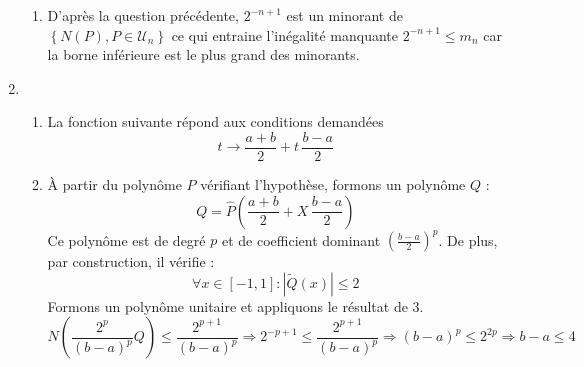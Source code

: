 \begin{enumerate}
\begin{enumerate}
\item D'après la question précédente, $2^{-n+1}$ est un minorant de $\left\lbrace N(P), P\in \mathcal U_n \right\rbrace$ ce qui entraine l'inégalité manquante $2^{-n+1}\leq m_n$ car la borne inférieure est le plus grand des minorants.
\end{enumerate}
\item \begin{enumerate}
 \item La fonction suivante répond aux conditions demandées
\begin{displaymath}
 t \rightarrow \frac{a+b}{2} + t\,\frac{b-a}{2}
\end{displaymath}
\item \`A partir du polynôme $P$ vérifiant l'hypothèse, formons un polynôme $Q$ :
\begin{displaymath}
 Q = \widehat{P}(\frac{a+b}{2} + X\,\frac{b-a}{2})
\end{displaymath}
Ce polynôme est de degré $p$ et de coefficient dominant $(\frac{b-a}{2})^p$. De plus, par construction, il vérifie :
\begin{displaymath}
 \forall x\in[-1,1] : \left\vert\widetilde{Q}(x)\right\vert\leq 2
\end{displaymath}
Formons un polynôme unitaire et appliquons le résultat de 3.
\begin{displaymath}
 N\left( \frac{2^p}{(b-a)^p}Q\right)\leq  \frac{2^{p+1}}{(b-a)^p} \Rightarrow
2^{-p+1}\leq \frac{2^{p+1}}{(b-a)^p} \Rightarrow
(b-a)^p \leq 2^{2p}\Rightarrow b-a\leq 4
\end{displaymath}

\end{enumerate}

\end{enumerate}

